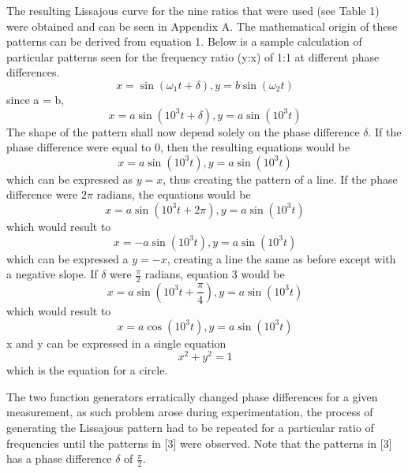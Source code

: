 \documentclass[twoside]{article}
\begin{document}
The resulting Lissajous curve for the nine ratios that were used (see Table 1) were obtained and can be seen in Appendix A. 
The mathematical origin of these patterns can be derived from equation 1. Below is a sample calculation of particular patterns seen for the frequency ratio (y:x) of 1:1 
at different phase differences.
\begin{equation}
x = \sin{(\omega_1 t + \delta)}, y = b \sin{(\omega_2 t)}
\end{equation}
since a = b,
\begin{equation}
x = a \sin{(10^3 t + \delta)}, y = a \sin{(10^3 t)}
\end{equation}
The shape of the pattern shall now depend solely on the phase difference $\delta$. If the phase difference were equal to 0, then the resulting equations would be
\begin{equation}
x = a \sin{(10^3 t)}, y = a \sin{(10^3 t)}
\end{equation}
which can be expressed as $y = x$, thus creating the pattern of a line. If the phase difference were $2\pi$ radians, the equations would be
\begin{equation}
x = a \sin{(10^3 t + 2\pi)}, y = a \sin{(10^3 t)}
\end{equation}
which would result to
\begin{equation}
x = - a \sin{(10^3 t)}, y = a \sin{(10^3 t)}
\end{equation}
which can be expressed a $y = -x$, creating a line the same as before except with a negative slope. If $\delta$ were $\frac{\pi}{2}$ radians, equation 3 would be
\begin{equation}
x = a \sin{(10^3 t + \frac{\pi}{4})}, y = a \sin{(10^3 t)}
\end{equation}
which would result to
\begin{equation}
x = a \cos{(10^3 t)}, y = a \sin{(10^3 t)}
\end{equation}
x and y can be expressed in a single equation
\begin{equation}
x^2 + y^2 = 1
\end{equation}
which is the equation for a circle.

The two function generators erratically changed phase differences for a given measurement, as such problem arose during experimentation, the process of generating the Lissajous pattern had to be repeated for a particular ratio of frequencies until the patterns in [3] were observed. Note that the patterns in [3] has a phase difference $\delta$ of $\frac{\pi}{2}$.
\end{document}
